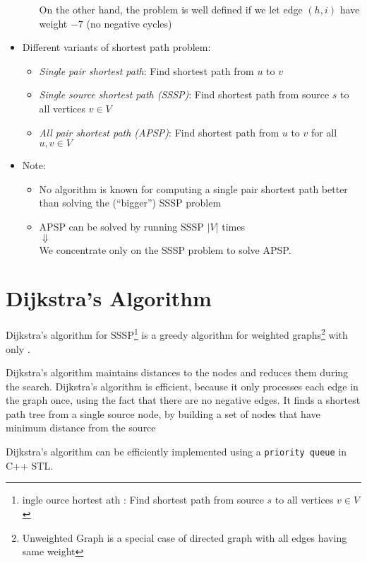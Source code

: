 \documentclass[twoside,12pt,a4paper,english]{book}
\theoremstyle{definition}
\theoremstyle{problemstyle}
\theoremstyle{problemstyle}
\theoremstyle{problemstyle}
\begin{document}
\begin{itemize}
\begin{itemize}
  On the other hand, the problem is well defined if we let edge
  $(h,i)$ have weight $-7$ (no negative cycles)
\end{itemize}
\item Different variants of shortest path problem:
  \begin{itemize}
  \item {\em Single pair shortest path}: Find shortest path from $u$
    to $v$
  \item {\em Single source shortest path (SSSP)}: Find shortest path
    from source $s$ to all vertices $v \in V$
  \item {\em All pair shortest path (APSP)}: Find shortest path from
    $u$ to $v$ for all $u,v \in V$
  \end{itemize}
\item Note:
  \begin{itemize}
  \item No algorithm is known for computing a single pair shortest path
    better than solving the (``bigger'') SSSP problem
  \item APSP can be solved by running SSSP $\vert V \vert$ times \\
    $\Downarrow$ \\
    We concentrate only on the SSSP problem to solve APSP.
  \end{itemize}
\end{itemize}

\chapter{Dijkstra’s Algorithm}

Dijkstra’s algorithm for SSSP\footnote{ingle ource hortest ath : Find shortest path from source $s$ to all vertices $v \in V$} is a greedy algorithm for weighted graphs\footnote{Unweighted Graph is a special case of directed graph with all edges having same weight} with only .

Dijkstra’s algorithm maintains distances
to the nodes and reduces them during the search. Dijkstra’s algorithm is efficient,
because it only processes each edge in the graph once, using the fact that there
are no negative edges. It finds a shortest path tree from a single source node, by building a set of nodes that have minimum distance from the source

Dijkstra's algorithm can be efficiently implemented using a \texttt{priority queue} in C++ STL.
\end{document}
